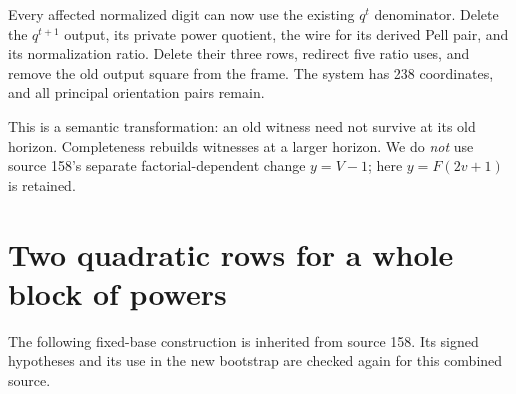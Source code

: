 \documentclass[11pt,letterpaper]{article}
\theoremstyle{remark}
\begin{document}
Every affected normalized digit can now use the existing \(q^t\)
denominator. Delete the \(q^{t+1}\) output, its private power
quotient, the wire for its derived Pell pair, and its normalization
ratio. Delete their three rows, redirect five ratio uses, and remove
the old output square from the frame. The system has 238 coordinates,
and all principal orientation pairs remain.

This is a semantic transformation: an old witness need not survive
at its old horizon. Completeness rebuilds witnesses at a larger
horizon. We do \emph{not} use source 158's separate
factorial-dependent change \(y=V-1\); here \(y=F(2v+1)\) is retained.

\section{Two quadratic rows for a whole block of powers}

The following fixed-base construction is inherited from source 158.
Its signed hypotheses and its use in the new bootstrap are checked
again for this combined source.
\end{document}
